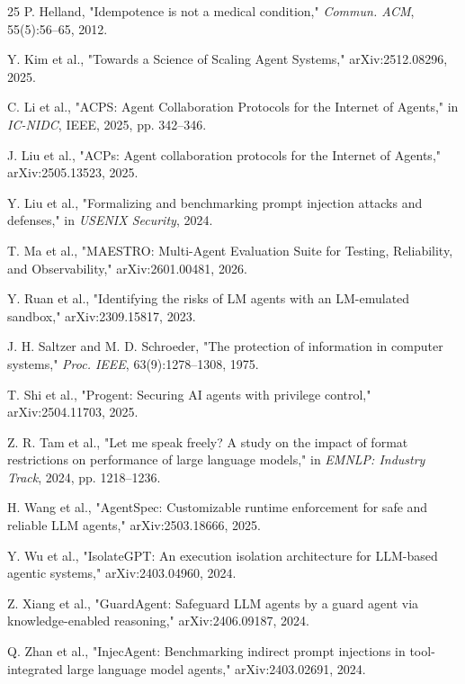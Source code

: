 \documentclass[runningheads,a4paper]{llncs}
\begin{document}
\begin{thebibliography}{25}
 P. Helland, "Idempotence is not a medical condition," \emph{Commun. ACM}, 55(5):56--65, 2012.

 Y. Kim et al., "Towards a Science of Scaling Agent Systems," arXiv:2512.08296, 2025.

 C. Li et al., "ACPS: Agent Collaboration Protocols for the Internet of Agents," in \emph{IC-NIDC}, IEEE, 2025, pp. 342--346.

 J. Liu et al., "ACPs: Agent collaboration protocols for the Internet of Agents," arXiv:2505.13523, 2025.

 Y. Liu et al., "Formalizing and benchmarking prompt injection attacks and defenses," in \emph{USENIX Security}, 2024.

 T. Ma et al., "MAESTRO: Multi-Agent Evaluation Suite for Testing, Reliability, and Observability," arXiv:2601.00481, 2026.

 Y. Ruan et al., "Identifying the risks of LM agents with an LM-emulated sandbox," arXiv:2309.15817, 2023.

 J. H. Saltzer and M. D. Schroeder, "The protection of information in computer systems," \emph{Proc. IEEE}, 63(9):1278--1308, 1975.

 T. Shi et al., "Progent: Securing AI agents with privilege control," arXiv:2504.11703, 2025.

 Z. R. Tam et al., "Let me speak freely? A study on the impact of format restrictions on performance of large language models," in \emph{EMNLP: Industry Track}, 2024, pp. 1218--1236.

 H. Wang et al., "AgentSpec: Customizable runtime enforcement for safe and reliable LLM agents," arXiv:2503.18666, 2025.

 Y. Wu et al., "IsolateGPT: An execution isolation architecture for LLM-based agentic systems," arXiv:2403.04960, 2024.

 Z. Xiang et al., "GuardAgent: Safeguard LLM agents by a guard agent via knowledge-enabled reasoning," arXiv:2406.09187, 2024.

 Q. Zhan et al., "InjecAgent: Benchmarking indirect prompt injections in tool-integrated large language model agents," arXiv:2403.02691, 2024.

\end{thebibliography}
\end{document}
